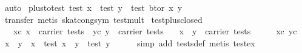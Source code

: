 \begin{isabellebody}
\ auto\isanewline
{}\isamarkupfalse%
%
\endisatagproof
{\isafoldproof}%
%
\isadelimproof
\isanewline
%
\endisadelimproof
\isanewline
{}\isamarkupfalse%
\ plus{}to{}test{}\ {}test\ x\ {}\ test\ y\ {}\ test\ {}bt{}or\ x\ y{}{}\isanewline
%
\isadelimproof
\ \ %
\endisadelimproof
%
\isatagproof
{}\isamarkupfalse%
\ {}transfer{}\ metis\ skat{}cong{}sym\ test{}mult{}%
\endisatagproof
{\isafoldproof}%
%
\isadelimproof
\isanewline
%
\endisadelimproof
\isanewline
{}\isamarkupfalse%
\ test{}plus{}closed{}\isanewline
\ \ \ xc{}\ {}x\ {}\ carrier\ tests{}\ \ yc{}\ {}y\ {}\ carrier\ tests{}\isanewline
\ \ \ {}x\ {}\ y\ {}\ carrier\ tests{}\isanewline
%
\isadelimproof
%
\endisadelimproof
%
\isatagproof
{}\isamarkupfalse%
\ {}\isanewline
\ \ \isamarkupfalse%
\ xc\ yc\ \isamarkupfalse%
\ x{}\ \ y{}\ \ {}x\ {}\ test\ x{}{}\ \ {}y\ {}\ test\ y{}{}\isanewline
\ \ \ \ \isamarkupfalse%
\ {}simp\ add{}\ tests{}def{}\ metis\ test{}ex{}\isanewline

\end{isabellebody}
